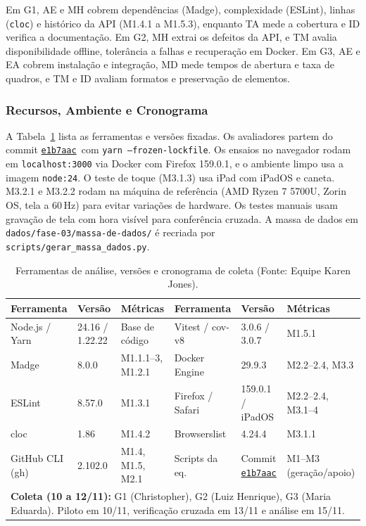 \documentclass[12pt]{article}
\newcommand{\commitref}{\href{https://github.com/excalidraw/excalidraw/commit/e1b7aacb356a492aa1e0fc6eb57b8896124027f0}{\texttt{e1b7aac}}}
\renewcommand{\arraystretch}{0.9}
\begin{document}
Em G1, AE e MH cobrem dependências (Madge), complexidade (ESLint), linhas (\texttt{cloc}) e histórico da API (M1.4.1 a M1.5.3), enquanto TA mede a cobertura e ID verifica a documentação. Em G2, MH extrai os defeitos da API, e TM avalia disponibilidade offline, tolerância a falhas e recuperação em Docker. Em G3, AE e EA cobrem instalação e integração, MD mede tempos de abertura e taxa de quadros, e TM e ID avaliam formatos e preservação de elementos.

\subsubsection{Recursos, Ambiente e Cronograma}
\label{subsubsec:recursos}

A Tabela~\ref{tab:ferramentas} lista as ferramentas e versões fixadas. Os avaliadores partem do commit \commitref\ com \texttt{yarn --frozen-lockfile}. Os ensaios no navegador rodam em \texttt{localhost:3000} via Docker com Firefox 159.0.1, e o ambiente limpo usa a imagem \texttt{node:24}. O teste de toque (M3.1.3) usa iPad com iPadOS e caneta. M3.2.1 e M3.2.2 rodam na máquina de referência (AMD Ryzen 7 5700U, Zorin OS, tela a 60\,Hz) para evitar variações de hardware. Os testes manuais usam gravação de tela com hora visível para conferência cruzada. A massa de dados em \texttt{dados/fase-03/massa-de-dados/} é recriada por \texttt{scripts/gerar\_massa\_dados.py}.

\begin{table}[!ht]
\centering
\caption{Ferramentas de análise, versões e cronograma de coleta (Fonte: Equipe Karen Jones).}
\label{tab:ferramentas}
\vspace{1pt}
\scriptsize
\setlength{\tabcolsep}{2pt}
\renewcommand{\arraystretch}{0.80}
\begin{tabular}{p{2.2cm}p{2.1cm}p{2.7cm}|p{2.2cm}p{2.1cm}p{2.7cm}}
\toprule
\textbf{Ferramenta} & \textbf{Versão} & \textbf{Métricas} & \textbf{Ferramenta} & \textbf{Versão} & \textbf{Métricas} \\
\midrule
Node.js / Yarn   & 24.16 / 1.22.22  & Base de código    & Vitest / cov-v8 & 3.0.6 / 3.0.7    & M1.5.1 \\
Madge            & 8.0.0            & M1.1.1--3, M1.2.1 & Docker Engine   & 29.9.3           & M2.2--2.4, M3.3 \\
ESLint           & 8.57.0           & M1.3.1            & Firefox / Safari & 159.0.1 / iPadOS & M2.2--2.4, M3.1--4 \\
cloc             & 1.86             & M1.4.2            & Browserslist    & 4.24.4           & M3.1.1 \\
GitHub CLI (gh)  & 2.102.0          & M1.4, M1.5, M2.1  & Scripts da eq.  & Commit \commitref & M1--M3 (geração/apoio) \\
\midrule
\multicolumn{6}{p{14.6cm}}{\textbf{Coleta (10 a 12/11):} G1 (Christopher), G2 (Luiz Henrique), G3 (Maria Eduarda). Piloto em 10/11, verificação cruzada em 13/11 e análise em 15/11.} \\
\bottomrule
\end{tabular}
\end{table}
\end{document}
